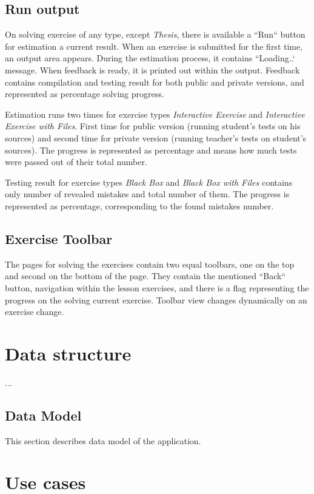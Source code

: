     
    \subsection{Run output}
    On solving exercise of any type, except \textit{Thesis}, there is available a ``Run`` button for estimation a current result. When an exercise is submitted for the first time, an output area appears. During the estimation process, it contains ``Loading..` message. When feedback is ready, it is printed out within the output. Feedback contains compilation and testing result for both public and private versions, and represented as percentage solving progress.
    
    Estimation runs two times for exercise types \textit{Interactive Exercise} and \textit{Interactive Exercise with Files}. First time for public version (running student's tests on his sources) and second time for private version (running teacher's tests on student's sources). The progress is represented as percentage and means how much tests were passed out of their total number.
    
    Testing result for exercise types \textit{Black Box} and \textit{Black Box with Files} contains only number of revealed mistakes and total number of them. The progress is represented as percentage, corresponding to the found mistakes number.
    
    
    \subsection{Exercise Toolbar}
    The pages for solving the exercises contain two equal toolbars, one on the top and second on the bottom of the page. They contain the mentioned ``Back`` button, navigation within the lesson exercises, and there is a flag representing the progress on the solving current exercise. Toolbar view changes dynamically on an exercise change.


\section{Data structure}
...

    \subsection{Data Model}
    This section describes data model of the application.
    
    


\section{Use cases}

